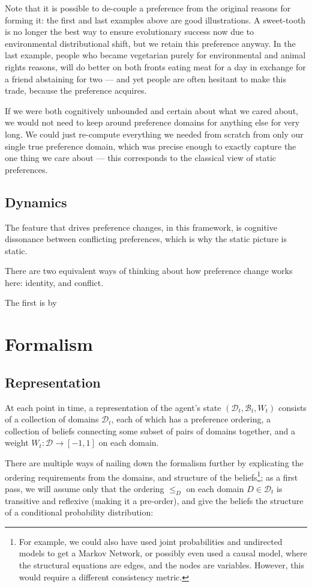 \documentclass{article}
\begin{document}
	Note that it is possible to de-couple a preference from the original reasons for forming it: the first and last examples above are good illustrations. A sweet-tooth is no longer the best way to ensure evolutionary success now due to environmental distributional shift, but we retain this preference anyway. In the last example, people who became vegetarian purely for environmental and animal rights reasons, will do better on both fronts eating meat for a day in exchange for a friend abstaining for two --- and yet people are often hesitant to make this trade, because the preference acquires.
	
	If we were both cognitively unbounded and certain about what we cared about, we would not need to keep around preference domains for anything else for very long. We could just re-compute everything we needed from scratch from only our single true preference domain, which was precise enough to exactly capture the one thing we care about --- this corresponds to the classical view of static preferences.
	
	
	\subsection{Dynamics}
	The feature that drives preference changes, in this framework, is cognitive dissonance between conflicting preferences, which is why the static picture is static.
	
	There are two equivalent ways of thinking about how preference change works here: identity, and conflict.
	
	The first is by 
	

	\section{Formalism}
	\subsection{Representation}
	At each point in time, a representation of the agent's state $(\mathcal D_t, \mathcal B_t, W_t)$ consists of a collection of domains $\mathcal D_t$, each of which has a preference ordering, a collection of beliefs connecting some subset of pairs of domains together, and a weight $W_t : \mathcal D \to [-1,1]$ on each domain.
	
	There are multiple ways of nailing down the formalism further by explicating the ordering requirements from the domains, and structure of the beliefs\footnote{For example, we could also have used joint probabilities and undirected models to get a Markov Network, or possibly even used a causal model, where the structural equations are edges, and the nodes are variables. However, this would require a different consistency metric.}; as a first pass, we will assume only that the ordering $\leq_D$ on each domain $D \in \mathcal D_t$ is transitive and reflexive (making it a pre-order), and give the beliefs the structure of a conditional probability distribution:
	
\end{document}
